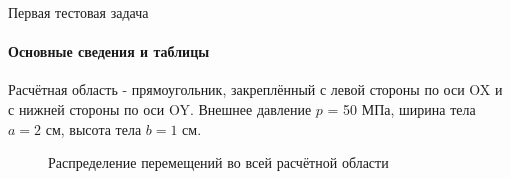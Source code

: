 \documentclass{beamer}
\begin{document}
\begin{frame}{Первая тестовая задача}
\framesubtitle{Основные сведения и таблицы}
\footnotesize
\begin{multicols}{2}
Расчётная область - прямоугольник, закреплённый с левой стороны по оси OX и с нижней стороны по оси OY. Внешнее давление $p$ = 50 МПа, ширина тела $a = 2$ см, высота тела $b = 1$ см.
\vspace{-1cm}
\begin{figure}[h]
\caption{Распределение перемещений во всей расчётной области}
\end{figure}

\columnbreak


\end{multicols}
\end{frame}
\end{document}
